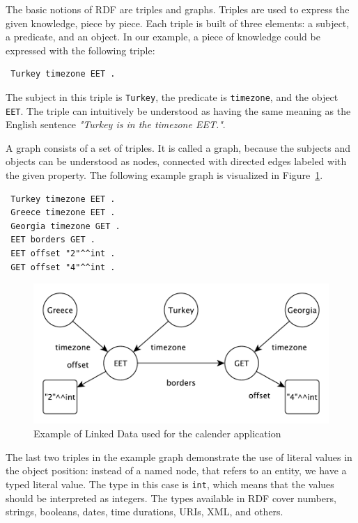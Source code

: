 \documentclass{IOS-Book-Article}
\begin{document}
The basic notions of RDF are triples and graphs.
Triples are used to express the given knowledge, piece by piece.
Each triple is built of three elements: a subject, a predicate, and an object.
In our example, a piece of knowledge could be expressed with the following triple:

\begin{verbatim}
 Turkey timezone EET .
\end{verbatim}

The subject in this triple is \texttt{Turkey}, the predicate is \texttt{timezone}, and the object \texttt{EET}.
The triple can intuitively be understood as having the same meaning as the English sentence \textit{"Turkey is in the timezone EET."}.

A graph consists of a set of triples.
It is called a graph, because the subjects and objects can be understood as nodes, connected with directed edges labeled with the given property.
The following example graph is visualized in Figure~\ref{fig:graph}.
\begin{verbatim}
 Turkey timezone EET .
 Greece timezone EET .
 Georgia timezone GET .
 EET borders GET .
 EET offset "2"^^int .
 GET offset "4"^^int . 
\end{verbatim}

\begin{figure}
\includegraphics[width=\linewidth]{fig_graph.pdf}
\caption{Example of Linked Data used for the calender application}
\label{fig:graph}
\end{figure}

The last two triples in the example graph demonstrate the use of literal values in the object position: instead of a named node, that refers to an entity, we have a typed literal value.
The type in this case is \texttt{int}, which means that the values should be interpreted as integers.
The types available in RDF cover numbers, strings, booleans, dates, time durations, URIs, XML, and others.
\end{document}
